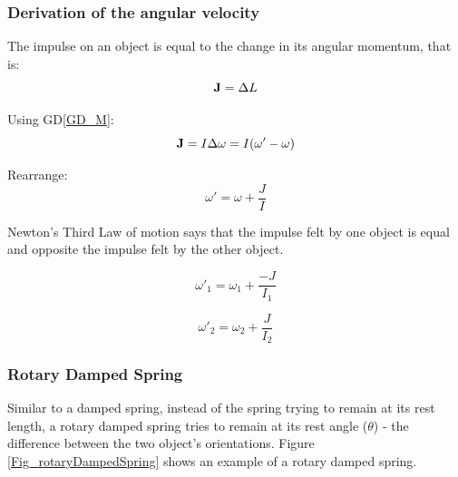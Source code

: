 \documentclass[12pt]{article}
\begin{document}
\subsubsection {Derivation of the angular velocity}

The impulse on an object is equal to the change in its angular momentum, that
is:
\begin{equation*}
\textbf J = \Delta  L 
\end{equation*}

\noindent 
Using GD\ref{GD_M}:
\begin{equation*}
\textbf J  = I\Delta \omega = I(\omega' - \omega)
\end{equation*}

\noindent
Rearrange: 
\begin{equation*}
\omega'=   \omega + \frac{J}{ I}
\end{equation*}

\noindent
Newton's Third Law of motion says that the impulse felt by one object is
equal and opposite the impulse felt by the other object.
  
\begin{equation*}
  \omega'_\text{1} =   \omega_\text{1} + \frac{ - J}{ I_\text{1}}
  \end{equation*}
  
\begin{equation*}
    \omega'_\text{2}  =  \omega_\text{2} +   \frac{ J}{ I_\text{2}}
  \end{equation*}
  
\subsubsection{Rotary Damped Spring} \label{SecConstraintFig}
Similar to a damped spring, instead of the spring trying to remain at its
rest length, a rotary damped spring tries to remain at its rest angle ($\theta$)
-
the difference between the two object's orientations. 
Figure \ref{Fig_rotaryDampedSpring} shows an example of a rotary damped spring.
~\newline
\end{document}
